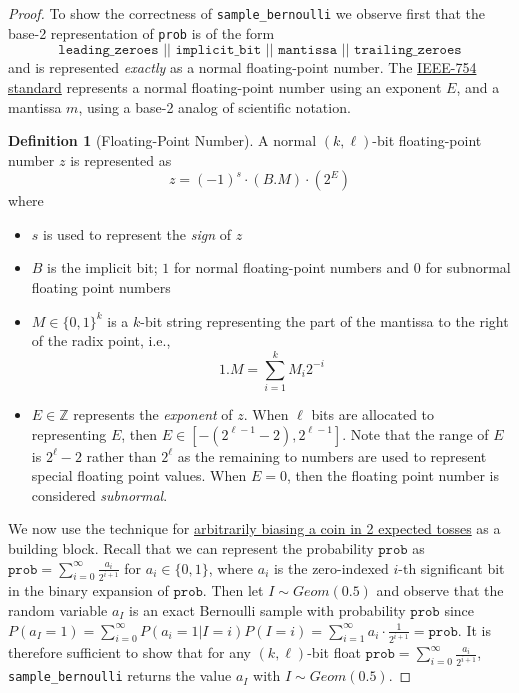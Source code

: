 \documentclass[11pt,a4paper]{article}
\theoremstyle{definition}
\newtheorem{definition}{Definition}
\begin{document}
\begin{proof} To show the correctness of \texttt{sample\_bernoulli} we observe first that the base-2 representation of \texttt{prob} is of the form 
\[
\texttt{leading\_zeroes || implicit\_bit || mantissa || trailing\_zeroes}
\]
and is represented \emph{exactly} as a normal floating-point number. The \href{https://en.wikipedia.org/wiki/IEEE_754}{IEEE-754 standard} represents a normal floating-point number using an exponent $E$, and a mantissa $m$, using a base-2 analog of scientific notation. 

\begin{definition}[Floating-Point Number]
A normal $(k,\ell)$-bit floating-point number $z$ is represented as
\[
z = (-1)^s \cdot (B.M) \cdot (2^E) 
\]
where
\begin{itemize}
    \item $s$ is used to represent the \emph{sign} of $z$
    \item $B$ is the implicit bit; $1$ for normal floating-point numbers and $0$ for subnormal floating point numbers
    \item $M \in \{0,1\}^k$ is a $k$-bit string representing the part of the mantissa to the right of the radix point, i.e.,
    \[
    1.M = \sum_{i = 1}^k M_i2^{-i}
    \]
    \item $E \in \mathbb{Z}$ represents the \emph{exponent} of $z$. When $\ell$ bits are allocated to representing $E$, then $E \in [-(2^{\ell - 1} - 2), 2^{\ell - 1}]$. Note that the range of $E$ is $2^\ell - 2$ rather than $2^\ell$ as the remaining to numbers are used to represent special floating point values. When $E = 0$, then the floating point number is considered \emph{subnormal}. 
\end{itemize} 
\end{definition}

We now use the technique for \href{https://web.archive.org/web/20160418185834/https://amakelov.wordpress.com/2013/10/10/arbitrarily-biasing-a-coin-in-2-expected-tosses/}{arbitrarily biasing a coin in 2 expected tosses} as a building block. Recall that we can represent the probability $\texttt{prob}$ as $\texttt{prob} = \sum_{i = 0}^\infty \frac{a_i}{2^{i + 1}}$ for $a_i \in \{0, 1\}$, where $a_i$ is the zero-indexed $i$-th significant bit in the binary expansion of $\texttt{prob}$. Then let $I \sim Geom(0.5)$ and observe that the random variable $a_I$ is an exact Bernoulli sample with probability $\texttt{prob}$ since $P(a_I = 1) = \sum_{i = 0}^\infty P(a_i = 1|I = i)P(I = i) = \sum_{i = 1}^\infty a_i \cdot \frac{1}{2^{i + 1}} = \texttt{prob}$. It is therefore sufficient to show that for any $(k,\ell)$-bit float $\texttt{prob} = \sum_{i = 0}^\infty \frac{a_i}{2^{i + 1}}$, \texttt{sample\_bernoulli} returns the value $a_I$ with $I \sim Geom(0.5)$.


\end{proof}
\end{document}
